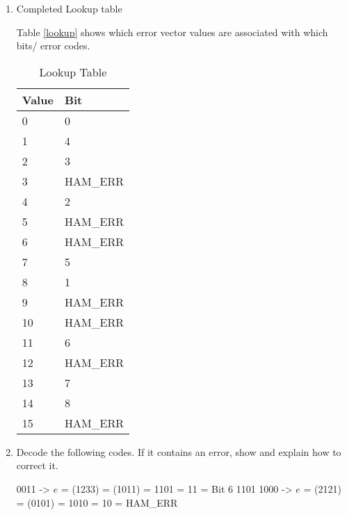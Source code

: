 \documentclass[12pt]{article}
\newenvironment{QandA}{\begin{enumerate}[label=\bfseries\alph*.]\bfseries}
{\end{enumerate}}
\newenvironment{answered}{\par\normalfont}{}
\begin{document}
\begin{QandA}

\item Completed Lookup table

	\begin{answered}

		Table \vref{lookup} shows which error vector values are associated with
		which bits/ error codes.

		\begin{table}[]
			\centering
			\begin{tabular}{l|l}
				\textbf{Value} & \textbf{Bit} \\ \hline
				0              & 0            \\
				1              & 4            \\
				2              & 3            \\
				3              & HAM\_ERR     \\
				4              & 2            \\
				5              & HAM\_ERR     \\
				6              & HAM\_ERR     \\
				7              & 5            \\
				8              & 1            \\
				9              & HAM\_ERR     \\
				10             & HAM\_ERR     \\
				11             & 6            \\
				12             & HAM\_ERR     \\
				13             & 7            \\
				14             & 8            \\
				15             & HAM\_ERR    
			\end{tabular}
			\caption{Lookup Table}\label{lookup}
		\end{table}

	\end{answered}

	\item Decode the following codes. If it contains an error, show and explain
		how to correct it.

	\begin{answered}
		1110 0011 -> $e$ = (1233) = (1011) = 1101 = 11 = Bit 6
		1101 1000 -> $e$ = (2121) = (0101) = 1010 = 10 = HAM\_ERR
	\end{answered}

\end{QandA}
\end{document}
